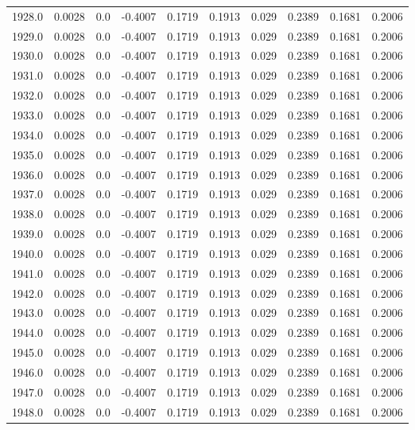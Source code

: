 \begin{longtable}{lrrrrrrrrr}
1928.0 & 0.0028 & 0.0 & -0.4007 & 0.1719 & 0.1913 & 0.029 & 0.2389 & 0.1681 & 0.2006 \\
1929.0 & 0.0028 & 0.0 & -0.4007 & 0.1719 & 0.1913 & 0.029 & 0.2389 & 0.1681 & 0.2006 \\
1930.0 & 0.0028 & 0.0 & -0.4007 & 0.1719 & 0.1913 & 0.029 & 0.2389 & 0.1681 & 0.2006 \\
1931.0 & 0.0028 & 0.0 & -0.4007 & 0.1719 & 0.1913 & 0.029 & 0.2389 & 0.1681 & 0.2006 \\
1932.0 & 0.0028 & 0.0 & -0.4007 & 0.1719 & 0.1913 & 0.029 & 0.2389 & 0.1681 & 0.2006 \\
1933.0 & 0.0028 & 0.0 & -0.4007 & 0.1719 & 0.1913 & 0.029 & 0.2389 & 0.1681 & 0.2006 \\
1934.0 & 0.0028 & 0.0 & -0.4007 & 0.1719 & 0.1913 & 0.029 & 0.2389 & 0.1681 & 0.2006 \\
1935.0 & 0.0028 & 0.0 & -0.4007 & 0.1719 & 0.1913 & 0.029 & 0.2389 & 0.1681 & 0.2006 \\
1936.0 & 0.0028 & 0.0 & -0.4007 & 0.1719 & 0.1913 & 0.029 & 0.2389 & 0.1681 & 0.2006 \\
1937.0 & 0.0028 & 0.0 & -0.4007 & 0.1719 & 0.1913 & 0.029 & 0.2389 & 0.1681 & 0.2006 \\
1938.0 & 0.0028 & 0.0 & -0.4007 & 0.1719 & 0.1913 & 0.029 & 0.2389 & 0.1681 & 0.2006 \\
1939.0 & 0.0028 & 0.0 & -0.4007 & 0.1719 & 0.1913 & 0.029 & 0.2389 & 0.1681 & 0.2006 \\
1940.0 & 0.0028 & 0.0 & -0.4007 & 0.1719 & 0.1913 & 0.029 & 0.2389 & 0.1681 & 0.2006 \\
1941.0 & 0.0028 & 0.0 & -0.4007 & 0.1719 & 0.1913 & 0.029 & 0.2389 & 0.1681 & 0.2006 \\
1942.0 & 0.0028 & 0.0 & -0.4007 & 0.1719 & 0.1913 & 0.029 & 0.2389 & 0.1681 & 0.2006 \\
1943.0 & 0.0028 & 0.0 & -0.4007 & 0.1719 & 0.1913 & 0.029 & 0.2389 & 0.1681 & 0.2006 \\
1944.0 & 0.0028 & 0.0 & -0.4007 & 0.1719 & 0.1913 & 0.029 & 0.2389 & 0.1681 & 0.2006 \\
1945.0 & 0.0028 & 0.0 & -0.4007 & 0.1719 & 0.1913 & 0.029 & 0.2389 & 0.1681 & 0.2006 \\
1946.0 & 0.0028 & 0.0 & -0.4007 & 0.1719 & 0.1913 & 0.029 & 0.2389 & 0.1681 & 0.2006 \\
1947.0 & 0.0028 & 0.0 & -0.4007 & 0.1719 & 0.1913 & 0.029 & 0.2389 & 0.1681 & 0.2006 \\
1948.0 & 0.0028 & 0.0 & -0.4007 & 0.1719 & 0.1913 & 0.029 & 0.2389 & 0.1681 & 0.2006 \\

\end{longtable}
